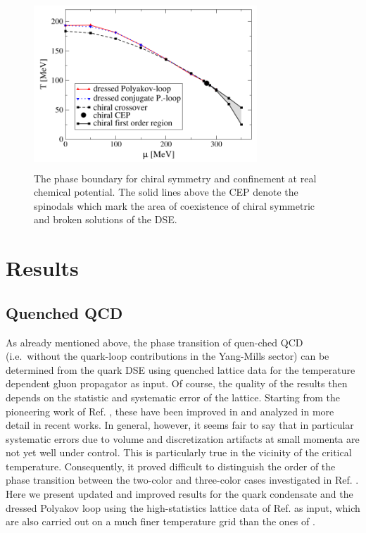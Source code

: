 \documentclass[a4paper,fleqn]{cas-dc}
\begin{document}
	\begin{figure}
		\centering
		\includegraphics[width=3.3in,height=2.5in]{fig5.png}
		\caption{The phase boundary for chiral symmetry and confinement at real chemical potential. The solid lines above the CEP denote the spinodals which
			mark the area of coexistence of chiral symmetric and broken solutions of the DSE.}
		\label{FIG:5}
	\end{figure}	
\section{Results}
\subsection{Quenched QCD}
As already mentioned above, the phase transition of quen-ched QCD (i.e.\ without the quark-loop contributions in the
Yang-Mills sector) can be determined from the quark DSE using quenched lattice data for the temperature dependent
gluon propagator as input. Of course, the quality of the results then depends on the statistic and systematic error of the
lattice. Starting from the pioneering work of Ref. \cite{PhysRevD.75.076003}, these have been improved in \cite{Fischer2010} and analyzed in more detail in recent
works. In general, however, it seems fair to say that in particular systematic errors due to volume and discretization
artifacts at small momenta are not yet well under control. This is particularly true in the vicinity of the critical temperature.
Consequently, it proved difficult to distinguish the order of the phase transition between the two-color and three-color cases
investigated in Ref. \cite{Fischer2010}. Here we present updated and improved results for the quark condensate and the dressed Polyakov
loop using the high-statistics lattice data of Ref. as input, which are also carried out on a much finer temperature grid
than the ones of \cite{Fischer2010}.
\end{document}
